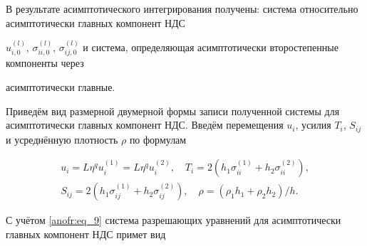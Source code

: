 В результате асимптотического интегрирования получены: система относительно асимптотически главных компонент НДС

$u_{i,0}^{(l)}$, $\sigma _{ii,0}^{(l)}$, $\sigma _{ij,0}^{(l)}$ и система, определяющая асимптотически второстепенные компоненты через

асимптотически главные.



Приведём вид размерной двумерной формы записи полученной системы для асимптотически главных компонент НДС. Введём перемещения $u_{i} $,  усилия $T_i$, $S_{ij}$ и усреднённую плотность $\rho $ по формулам

\begin{equation}

\begin{array}{c}

u_i =L\eta^q u_i^{(1)} =L\eta^q u_i^{(2)}, \quad T_i =2\left(h_1 \sigma _{ii}^{(1)} +h_2 \sigma _{ii}^{(2)} \right), \\

S_{ij} =2\left(h_1 \sigma _{ij}^{(1)} +h_2 \sigma _{ij}^{(2)} \right), \quad \rho =({\rho _1 h_1 +\rho _2 h_2})/{h}.

\end{array}

\label{anofr:eq_9}

\end{equation}



С учётом \eqref{anofr:eq_9} система разрешающих уравнений для асимптотически главных компонент НДС примет вид

